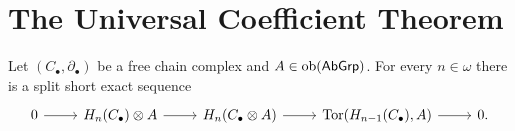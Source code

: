 \section*{The Universal Coefficient Theorem}
\begin{theorem}
	Let $(C_\bullet,\partial_\bullet)$ be a free chain complex and $A \in \operatorname{ob}(\mathsf{AbGrp})$. For every $n \in \omega$ there is a split short exact sequence
	\begin{equation*}
		\begin{tikzcd}
			0 \arrow[r] & H_n(C_\bullet) \otimes A \arrow[r] & H_n(C_\bullet \otimes A) \arrow[r] & \Tor(H_{n - 1}(C_\bullet),A) \arrow[r] & 0.
		\end{tikzcd}
	\end{equation*}
	\label{thm:UCT}
\end{theorem}
